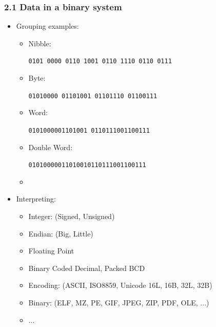 \begin{frame}[fragile]
  \frametitle{2.1 Data in a binary system}
    \begin{itemize}
        \item Grouping examples:
        \begin{itemize}
	    \item Nibble:\begin{footnotesize} \texttt{0101 0000 0110 1001 0110 1110 0110 0111} \end{footnotesize} 
            \item Byte:\begin{footnotesize} \texttt{01010000 01101001 01101110 01100111} \end{footnotesize}
            \item Word:\begin{footnotesize} \texttt{0101000001101001 0110111001100111} \end{footnotesize}
            \item Double Word:\begin{footnotesize} \texttt{01010000011010010110111001100111} \end{footnotesize}
	    \item[]
        \end{itemize}
        \item Interpreting:
        \begin{itemize}
	    \item Integer: (Signed, Unsigned)
	    \item Endian: (Big, Little)
            \item Floating Point
            \item Binary Coded Decimal, Packed BCD
	    \item Encoding: (ASCII, ISO8859, Unicode 16L, 16B, 32L, 32B)
	    \item Binary: (ELF, MZ, PE, GIF, JPEG, ZIP, PDF, OLE, ...)
            \item ...
        \end{itemize}
    \end{itemize}
\end{frame}


